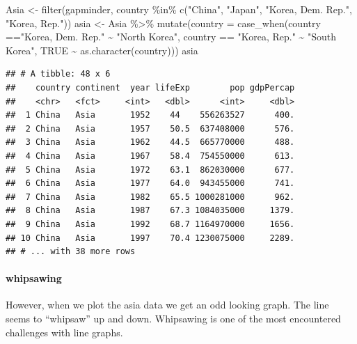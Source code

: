 \documentclass[
]{article}
\newenvironment{Shaded}{\begin{snugshade}}{\end{snugshade}}
\newcommand{\AttributeTok}[1]{\textcolor[rgb]{0.77,0.63,0.00}{#1}}
\newcommand{\ConstantTok}[1]{\textcolor[rgb]{0.00,0.00,0.00}{#1}}
\newcommand{\FunctionTok}[1]{\textcolor[rgb]{0.00,0.00,0.00}{#1}}
\newcommand{\NormalTok}[1]{#1}
\newcommand{\OtherTok}[1]{\textcolor[rgb]{0.56,0.35,0.01}{#1}}
\newcommand{\SpecialCharTok}[1]{\textcolor[rgb]{0.00,0.00,0.00}{#1}}
\newcommand{\StringTok}[1]{\textcolor[rgb]{0.31,0.60,0.02}{#1}}
\begin{document}
\begin{Shaded}
\begin{Highlighting}[]
\NormalTok{Asia }\OtherTok{\textless{}{-}} \FunctionTok{filter}\NormalTok{(gapminder, country }\SpecialCharTok{\%in\%} \FunctionTok{c}\NormalTok{(}\StringTok{"China"}\NormalTok{, }\StringTok{"Japan"}\NormalTok{, }\StringTok{"Korea, Dem. Rep."}\NormalTok{, }\StringTok{"Korea, Rep."}\NormalTok{))}
\NormalTok{asia }\OtherTok{\textless{}{-}}\NormalTok{ Asia }\SpecialCharTok{\%\textgreater{}\%} 
  \FunctionTok{mutate}\NormalTok{(}\AttributeTok{country =} \FunctionTok{case\_when}\NormalTok{(country }\SpecialCharTok{==}\StringTok{"Korea, Dem. Rep."} \SpecialCharTok{\textasciitilde{}} \StringTok{"North Korea"}\NormalTok{,}
\NormalTok{                                            country }\SpecialCharTok{==} \StringTok{"Korea, Rep."} \SpecialCharTok{\textasciitilde{}} \StringTok{"South Korea"}\NormalTok{,}
                                            \ConstantTok{TRUE} \SpecialCharTok{\textasciitilde{}} \FunctionTok{as.character}\NormalTok{(country)))}
\NormalTok{asia}
\end{Highlighting}
\end{Shaded}

\begin{verbatim}
## # A tibble: 48 x 6
##    country continent  year lifeExp        pop gdpPercap
##    <chr>   <fct>     <int>   <dbl>      <int>     <dbl>
##  1 China   Asia       1952    44    556263527      400.
##  2 China   Asia       1957    50.5  637408000      576.
##  3 China   Asia       1962    44.5  665770000      488.
##  4 China   Asia       1967    58.4  754550000      613.
##  5 China   Asia       1972    63.1  862030000      677.
##  6 China   Asia       1977    64.0  943455000      741.
##  7 China   Asia       1982    65.5 1000281000      962.
##  8 China   Asia       1987    67.3 1084035000     1379.
##  9 China   Asia       1992    68.7 1164970000     1656.
## 10 China   Asia       1997    70.4 1230075000     2289.
## # ... with 38 more rows
\end{verbatim}

\hypertarget{whipsawing}{%
\paragraph{whipsawing}\label{whipsawing}}

However, when we plot the asia data we get an odd looking graph. The
line seems to ``whipsaw'' up and down. Whipsawing is one of the most
encountered challenges with line graphs.
\end{document}
